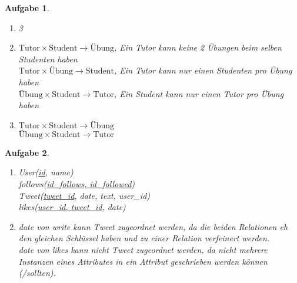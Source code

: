 \documentclass[11pt]{article}
\theoremstyle{break}
\newtheorem{task}{Aufgabe}
\begin{document}
\begin{task}
    \hfill\vspace{-5mm}
    \begin{enumerate}[label={(\alph*)}]
        \item 3
        \item[(b,c)] $\text{Tutor}\times\text{Student}\rightarrow\text{Übung}$, Ein Tutor kann keine 2 Übungen beim selben Studenten haben\\
        $\text{Tutor}\times\text{Übung}\rightarrow\text{Student}$, Ein Tutor kann nur einen Studenten pro Übung haben\\
        $\text{Übung}\times\text{Student}\rightarrow\text{Tutor}$, Ein Student kann nur einen Tutor pro Übung haben
        \item[(d)] $\text{Tutor}\times\text{Student}\rightarrow\text{Übung}$\\
        $\text{Übung}\times\text{Student}\rightarrow\text{Tutor}$ 
    \end{enumerate}
\end{task}

\begin{task}
    \hfill\vspace{-5mm}
    \begin{enumerate}[label={(\alph*)}]
        \item[(a,b)] User(\underline{id}, name)\\
        follows(\underline{id\_follows, id\_followed})\\
        Tweet(\underline{tweet\_id}, date, text, user\_id)\\
        likes(\underline{user\_id, tweet\_id}, date)
        \item[(c)] date von write kann Tweet zugeordnet werden, da die beiden Relationen eh den gleichen Schlüssel haben und zu einer Relation verfeinert werden.\\
        date von likes kann nicht Tweet zugeordnet werden, da nicht mehrere Instanzen eines Attributes in ein Attribut geschrieben werden können (/sollten).
    \end{enumerate}
\end{task}
\end{document}
